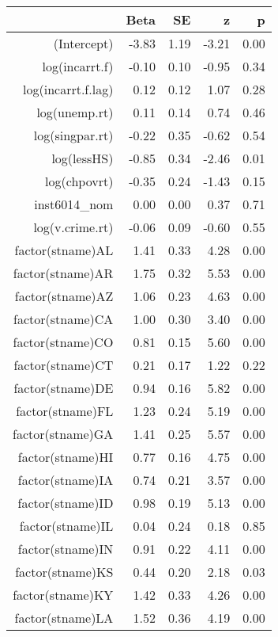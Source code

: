 \begin{table}[ht]
\centering
\begin{tabular}{rrrrr}
  \hline
 & Beta & SE & z & p \\ 
  \hline
(Intercept) & -3.83 & 1.19 & -3.21 & 0.00 \\ 
  log(incarrt.f) & -0.10 & 0.10 & -0.95 & 0.34 \\ 
  log(incarrt.f.lag) & 0.12 & 0.12 & 1.07 & 0.28 \\ 
  log(unemp.rt) & 0.11 & 0.14 & 0.74 & 0.46 \\ 
  log(singpar.rt) & -0.22 & 0.35 & -0.62 & 0.54 \\ 
  log(lessHS) & -0.85 & 0.34 & -2.46 & 0.01 \\ 
  log(chpovrt) & -0.35 & 0.24 & -1.43 & 0.15 \\ 
  inst6014\_nom & 0.00 & 0.00 & 0.37 & 0.71 \\ 
  log(v.crime.rt) & -0.06 & 0.09 & -0.60 & 0.55 \\ 
  factor(stname)AL & 1.41 & 0.33 & 4.28 & 0.00 \\ 
  factor(stname)AR & 1.75 & 0.32 & 5.53 & 0.00 \\ 
  factor(stname)AZ & 1.06 & 0.23 & 4.63 & 0.00 \\ 
  factor(stname)CA & 1.00 & 0.30 & 3.40 & 0.00 \\ 
  factor(stname)CO & 0.81 & 0.15 & 5.60 & 0.00 \\ 
  factor(stname)CT & 0.21 & 0.17 & 1.22 & 0.22 \\ 
  factor(stname)DE & 0.94 & 0.16 & 5.82 & 0.00 \\ 
  factor(stname)FL & 1.23 & 0.24 & 5.19 & 0.00 \\ 
  factor(stname)GA & 1.41 & 0.25 & 5.57 & 0.00 \\ 
  factor(stname)HI & 0.77 & 0.16 & 4.75 & 0.00 \\ 
  factor(stname)IA & 0.74 & 0.21 & 3.57 & 0.00 \\ 
  factor(stname)ID & 0.98 & 0.19 & 5.13 & 0.00 \\ 
  factor(stname)IL & 0.04 & 0.24 & 0.18 & 0.85 \\ 
  factor(stname)IN & 0.91 & 0.22 & 4.11 & 0.00 \\ 
  factor(stname)KS & 0.44 & 0.20 & 2.18 & 0.03 \\ 
  factor(stname)KY & 1.42 & 0.33 & 4.26 & 0.00 \\ 
  factor(stname)LA & 1.52 & 0.36 & 4.19 & 0.00 \\ 

\end{tabular}
\end{table}

